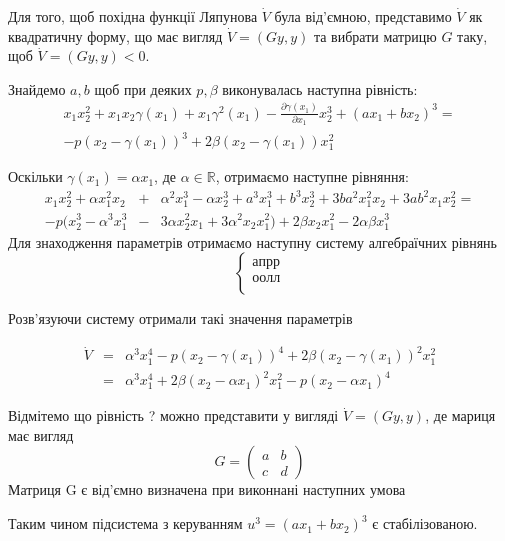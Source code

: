 \documentclass{article}
\begin{document}
Для того, щоб похідна функції Ляпунова $\dot V$ була від'ємною, представимо
 $\dot V$ як квадратичну форму, що має вигляд $\dot V =(Gy,y)$ 
та вибрати матрицю $G$ таку, щоб  $\dot V =(Gy,y) < 0$.

Знайдемо $a,b$ щоб при деяких $p, \beta$ виконувалась наступна рівність:
\begin{eqnarray}
    x_1x_2^2+x_1x_2\gamma(x_1) + x_1 \gamma^2(x_1) - 
    \frac{\partial \gamma(x_1)}{\partial x_1}x_2^3 + (ax_1+bx_2)^3 = \nonumber\\
    -p(x_2-\gamma(x_1))^3 +2\beta(x_2-\gamma(x_1))x_{1}^2 
\end{eqnarray}

Оскільки $\gamma(x_1)=\alpha x_1$, де $\alpha \in \mathbb{R}$,
отримаємо наступне рівняння:
\begin{eqnarray}
x_1x_{2}^2 + \alpha x_{1}^2x_2 &+& \alpha^2x_{1}^3 -\alpha x_{2}^3 
+ a^3x_{1}^3 + b^3x_{2}^3 + 3ba^2x_{1}^2x_2+\nonumber
3ab^2x_1x_{2}^2 =\\
-p(x_2^3 - \alpha^{3}x_{1}^3 &-& 3\alpha x_2^2x_{1} + 3\alpha^2x_2x_{1}^2)+
2\beta x_2x_{1}^2 - 2\alpha \beta x_1^3
\end{eqnarray}
Для знаходження параметрів отримаємо наступну систему алгебраїчних рівнянь 
\begin{equation}
    \begin{cases}
        апрр\\
        оолл\\
    \end{cases}
\end{equation}

Розв'язуючи  систему отримали такі значення параметрів 

\begin{eqnarray}
    \dot V &=& \alpha^3x_{1}^4 - p(x_2-\gamma(x_1))^4
    +2\beta(x_2-\gamma(x_1))^2x_{1}^2\nonumber\\ 
    &=&\alpha^3x_{1}^4 + 2\beta(x_2-\alpha x_1)^2x_{1}^2
    -p(x_2-\alpha x_1)^4
\end{eqnarray}

Відмітемо що рівність ? можно представити у вигляді $\dot V =(Gy,y)$, де 
мариця має вигляд 
\begin{equation}
G=\left(\begin{array}{clr}
    a & b\\
    c & d
\end{array}\right) 
\end{equation}
Матриця G є від'ємно визначена при виконнані наступних умова

Таким чином підсистема з керуванням  $u^3=(ax_1+bx_2)^3$ 
є стабілізованою. 
\end{document}
